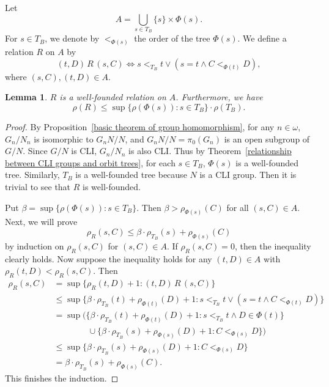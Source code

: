 \documentclass[11pt]{amsart}
\newtheorem{lemma}[theorem]{Lemma}
\theoremstyle{definition}
\theoremstyle{remark}
\numberwithin{equation}{section}
\begin{document}
Let
$$A=\bigcup_{s\in T_B}\{s\}\times\Phi(s).$$
For $s\in T_B$, we denote by $<_{\Phi(s)}$ the order of the tree $\Phi(s)$. We define a relation $R$ on $A$ by
$$(t,D)\,R\,(s,C)\iff s<_{T_B}t\lor(s=t\land C<_{\Phi(t)}D),$$
where $(s,C),(t,D)\in A$.
\begin{lemma}\label{upper bound on R}
    $R$ is a well-founded relation on $A$. Furthermore, we have
    $$\rho(R)\leq\sup\{\rho(\Phi(s)):s\in T_B\}\cdot\rho(T_B).$$
\end{lemma}
\begin{proof}
    By Proposition~\ref{basic theorem of group homomorphism}, for any $n\in\omega$, $G_n/N_n$ is isomorphic to $G_nN/N$, and $G_nN/N=\pi_0(G_n)$ is an open subgroup of $G/N$. Since $G/N$ is CLI, $G_n/N_n$ is also CLI. Thus by Theorem~\ref{relationship between CLI groups and orbit trees}, for each $s\in T_B$, $\Phi(s)$ is a well-founded tree. Similarly, $T_B$ is a well-founded tree because $N$ is a CLI group. Then it is trivial to see that $R$ is well-founded.

    Put $\beta=\sup\{\rho(\Phi(s)):s\in T_B\}$. Then $\beta>\rho_{\Phi(s)}(C)$ for all $(s,C)\in A$. Next, we will prove
    $$\rho_{R}(s,C)\leq\beta\cdot\rho_{T_B}(s)+\rho_{\Phi(s)}(C)$$
    by induction on $\rho_R(s,C)$ for $(s,C)\in A$.
    If $\rho_{R}(s,C)=0$, then the inequality clearly holds. Now suppose the inequality holds for any $(t,D)\in A$ with $\rho_{R}(t,D)<\rho_{R}(s,C)$. Then
    \begin{align*}
        \rho_{R}(s,C)&=\sup\{\rho_{R}(t,D)+1:(t,D)\,R\,(s,C)\} \\
        &\leq\sup\{\beta\cdot\rho_{T_B}(t)+\rho_{\Phi(t)}(D)+1:s<_{T_B}t\lor(s=t\land C<_{\Phi(t)}D)\} \\
        &=\sup(\{\beta\cdot\rho_{T_B}(t)+\rho_{\Phi(t)}(D)+1:s<_{T_B}t\land D\in\Phi(t)\} \\
        &\qquad\qquad\cup\{\beta\cdot\rho_{T_B}(s)+\rho_{\Phi(s)}(D)+1:C<_{\Phi(s)}D\}) \\
        &\leq\sup\{\beta\cdot\rho_{T_B}(s)+\rho_{\Phi(s)}(D)+1:C<_{\Phi(s)}D\}\\
        &=\beta\cdot\rho_{T_B}(s)+\rho_{\Phi(s)}(C).
    \end{align*}
    This finishes the induction.


\end{proof}
\end{document}
